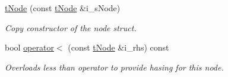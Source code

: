 \begin{DoxyCompactItemize}
\mbox{\hyperlink{structplanner_1_1t_node_a18891f54e73f974f1142fba95887de98}{t\+Node}} (const \mbox{\hyperlink{structplanner_1_1t_node}{t\+Node}} \&i\+\_\+s\+Node)
\begin{DoxyCompactList}\small\item\em Copy constructor of the node struct. \end{DoxyCompactList}\item 
bool \mbox{\hyperlink{structplanner_1_1t_node_a5085f3fcf4a960ed9fe14068f1b5e950}{operator$<$}} (const \mbox{\hyperlink{structplanner_1_1t_node}{t\+Node}} \&i\+\_\+rhs) const
\begin{DoxyCompactList}\small\item\em Overloads less than operator to provide hasing for this node. \end{DoxyCompactList}\end{DoxyCompactItemize}
